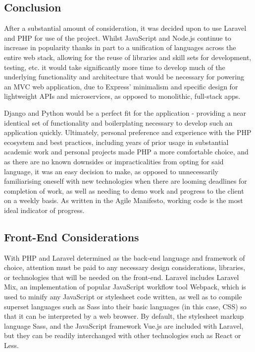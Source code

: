 \subsection{Conclusion}
After a substantial amount of consideration, it was decided upon to use Laravel and PHP for use of the project. Whilst JavaScript and Node.js continue to increase in popularity thanks in part to a unification of languages across the entire web stack, allowing for the reuse of libraries and skill sets for development, testing, etc. it would take significantly more time to develop much of the underlying functionality and architecture that would be necessary for powering an MVC web application, due to Express' minimalism and specific design for lightweight APIs and microservices, as opposed to monolithic, full-stack apps.  \cite{DjangovsNode}

Django and Python would be a perfect fit for the application - providing a near identical set of functionality and boilerplating necessary to develop such an application quickly. Ultimately, personal preference and experience with the PHP ecosystem and best practices, including years of prior usage in substantial academic work and personal projects made PHP a more comfortable choice, and as there are no known downsides or impracticalities from opting for said language, it was an easy decision to make, as opposed to unnecessarily familiarising oneself with new technologies when there are looming deadlines for completion of work, as well as needing to demo work and progress to the client on a weekly basis. As written in the Agile Manifesto, working code is the most ideal indicator of progress. \cite{Sierra1} \cite{beck2001agile}

\subsection{Front-End Considerations}
With PHP and Laravel determined as the back-end language and framework of choice, attention must be paid to any necessary design considerations, libraries, or technologies that will be needed on the front-end. Laravel includes Laravel Mix, an implementation of popular JavaScript workflow tool Webpack, which is used to minify any JavaScript or stylesheet code written, as well as to compile superset languages such as Sass into their basic languages (in this case, CSS) so that it can be interpreted by a web browser. By default, the stylesheet markup language Sass, and the JavaScript framework Vue.js are included with Laravel, but they can be readily interchanged with other technologies such as React or Less. \cite{Laravel2}

